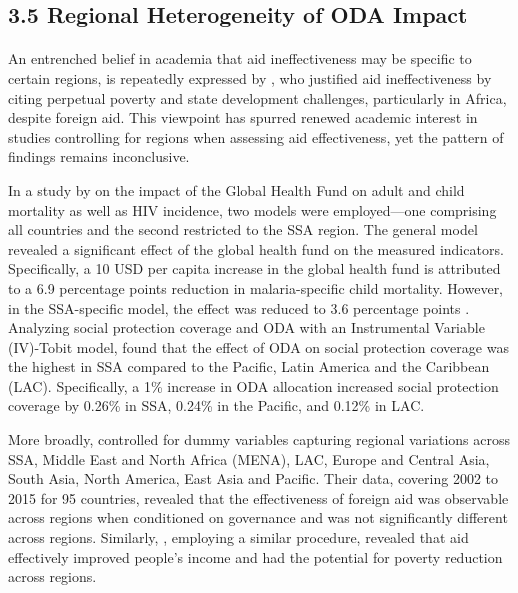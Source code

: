 \subsection*{3.5 Regional Heterogeneity of ODA Impact}
\paragraph{} An entrenched belief in academia that aid ineffectiveness may be specific to certain regions, is repeatedly expressed by \textcite{easterly_can_2009, easterly_aid_2004}, who justified aid ineffectiveness by citing perpetual poverty and state development challenges, particularly in Africa, despite foreign aid. This viewpoint has spurred renewed academic interest in studies controlling for regions when assessing aid effectiveness, yet the pattern of findings remains inconclusive.

In a study by \textcite{yan_mortality_2015} on the impact of the Global Health Fund on adult and child mortality as well as HIV incidence, two models were employed—one comprising all countries and the second restricted to the SSA region. The general model revealed a significant effect of the global health fund on the measured indicators. Specifically, a 10 USD per capita increase in the global health fund is attributed to a 6.9 percentage points reduction in malaria-specific child mortality. However, in the SSA-specific model, the effect was reduced to 3.6 percentage points \parencite{yan_mortality_2015}. Analyzing social protection coverage and ODA with an Instrumental Variable (IV)-Tobit model, \textcite{nino-zarazua_aids_2023} found that the effect of ODA on social protection coverage was the highest in SSA compared to the Pacific, Latin America and the Caribbean (LAC). Specifically, a 1\% increase in ODA allocation increased social protection coverage by 0.26\% in SSA, 0.24\% in the Pacific, and 0.12\% in LAC.

More broadly, \textcite{doucouliagos_health_2021} controlled for dummy variables capturing regional variations across SSA, Middle East and North Africa (MENA), LAC, Europe and Central Asia, South Asia, North America, East Asia and Pacific. Their data, covering 2002 to 2015 for 95 countries, revealed that the effectiveness of foreign aid was observable across regions when conditioned on governance and was not significantly different across regions. Similarly, \textcite{mohamed_foreign_2017}, employing a similar procedure, revealed that aid effectively improved people's income and had the potential for poverty reduction across regions.


